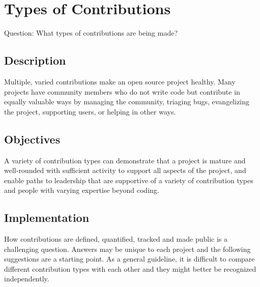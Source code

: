 \hypertarget{types-of-contributions}{%
\section{Types of Contributions}\label{types-of-contributions}}

Question: What types of contributions are being made?

\hypertarget{description}{%
\subsection{Description}\label{description}}

Multiple, varied contributions make an open source project healthy. Many
projects have community members who do not write code but contribute in
equally valuable ways by managing the community, triaging bugs,
evangelizing the project, supporting users, or helping in other ways.

\hypertarget{objectives}{%
\subsection{Objectives}\label{objectives}}

A variety of contribution types can demonstrate that a project is mature
and well-rounded with sufficient activity to support all aspects of the
project, and enable paths to leadership that are supportive of a variety
of contribution types and people with varying expertise beyond coding.

\hypertarget{implementation}{%
\subsection{Implementation}\label{implementation}}

How contributions are defined, quantified, tracked and made public is a
challenging question. Answers may be unique to each project and the
following suggestions are a starting point. As a general guideline, it
is difficult to compare different contribution types with each other and
they might better be recognized independently.

